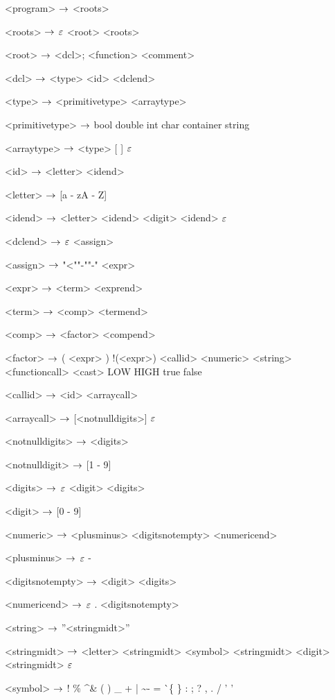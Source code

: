 \begin{grammar}
<program> $\rightarrow$ <roots>

<roots> $\rightarrow$ $\varepsilon$
\alt <root> <roots>

<root> $\rightarrow$ <dcl>;
\alt <function>
\alt <comment>

<dcl> $\rightarrow$ <type> <id> <dclend>

<type> $\rightarrow$ <primitivetype> <arraytype>

<primitivetype> $\rightarrow$ bool
\alt double
\alt int
\alt char
\alt container
\alt string

<arraytype> $\rightarrow$ <type> [ ]
\alt $\varepsilon$

<id> $\rightarrow$ <letter> <idend>

<letter> $\rightarrow$ [a - zA - Z]

<idend> $\rightarrow$ <letter> <idend>
	\alt <digit> <idend>
	\alt $\varepsilon$

<dclend> $\rightarrow$ $\varepsilon$
\alt <assign> 

<assign>  $\rightarrow$ "<""-""-" <expr>

<expr> $\rightarrow$ <term> <exprend>

<term> $\rightarrow$ <comp> <termend>

<comp> $\rightarrow$ <factor> <compend>

<factor> $\rightarrow$ ( <expr> )
	\alt !(<expr>)
	\alt <callid>
	\alt <numeric>
	\alt <string>
	\alt <functioncall> 
	\alt <cast>
	\alt LOW
	\alt HIGH
	\alt true
	\alt false

<callid> $\rightarrow$ <id> <arraycall>

<arraycall> $\rightarrow$ [<notnulldigits>]
\alt $\varepsilon$

<notnulldigits> $\rightarrow$ <digits>

<notnulldigit> $\rightarrow$ [1 - 9]

<digits> $\rightarrow$ $\varepsilon$
\alt <digit> <digits>

<digit> $\rightarrow$ [0 - 9]

<numeric> $\rightarrow$ <plusminus> <digitsnotempty> <numericend>

<plusminus> $\rightarrow$ $\varepsilon$
	\alt -

<digitsnotempty> $\rightarrow$ <digit> <digits>

<numericend> $\rightarrow$ $\varepsilon$
\alt . <digitsnotempty>

<string> $\rightarrow$ ''<stringmidt>''

<stringmidt> $\rightarrow$ <letter> <stringmidt>
\alt <symbol> <stringmidt>
\alt <digit> <stringmidt>
\alt $\varepsilon$

<symbol> $\rightarrow$ !
\alt \%
\alt \^
\alt \&
\alt (
\alt )
\alt \_
\alt +
\alt |
\alt \~
\alt -
\alt =
\alt \`
\alt \{
\alt \}
\alt [
\alt ]
\alt :
\alt ;
\alt ?
\alt ,
\alt .
\alt /
\alt ' '


\end{grammar}

